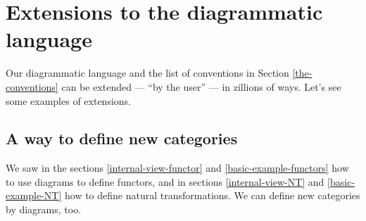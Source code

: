 \documentclass[oneside,12pt]{article}
\begin{document}
%                                                 
\section{Extensions to the diagrammatic language \DONE}
\label{extensions}

Our diagrammatic language and the list of conventions in Section
\ref{the-conventions} can be extended --- ``by the user'' --- in
zillions of ways. Let's see some examples of extensions.


%                                                           
\subsection{A way to define new categories \DONE}
\label{comma-categories}

We saw in the sections \ref{internal-view-functor} and
\ref{basic-example-functors} how to use diagrams to define functors,
and in sections \ref{internal-view-NT} and \ref{basic-example-NT} how
to define natural transformations. We can define new categories by
diagrams, too.

\pu
\def\commaobj#1#2#3#4{{
  \left(        \def\A{#1}
                \def\f{#4}
    \def\B{#2} \def\FB{#3}
     \diag{comma-obj-0}
  \right)
  }}


\def\dnAR{{(A{↓}R)}}
\end{document}
